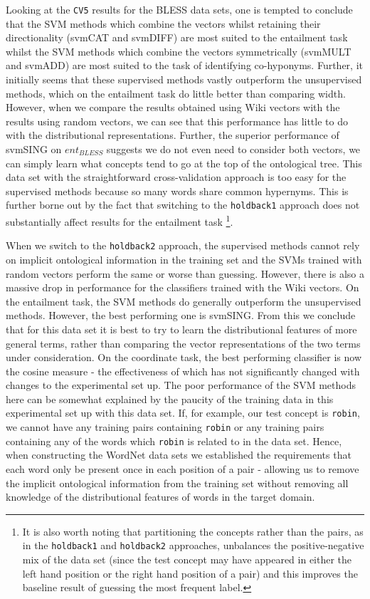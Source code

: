 \documentclass[11pt]{article}
\begin{document}
Looking at the \texttt{CV5} results for the BLESS data sets, one is tempted to conclude that the SVM methods which combine the vectors whilst retaining their directionality (svmCAT and svmDIFF) are most suited to the entailment task whilst the SVM methods which combine the vectors symmetrically (svmMULT and svmADD) are most suited to the task of identifying co-hyponyms.  Further, it initially seems that these supervised methods vastly outperform the unsupervised methods, which on the entailment task do little better than comparing width.  However, when we compare the results obtained using Wiki vectors with the results using random vectors, we can see that this performance has little to do with the distributional representations.  Further, the superior performance of svmSING on $ent_{BLESS}$ suggests we do not even need to consider both vectors, we can simply learn what concepts tend to go at the top of the ontological tree.  This data set with the straightforward cross-validation approach is too easy for the supervised methods because so many words share common hypernyms.  This is further borne out by the fact that switching to the \texttt{holdback1} approach does not substantially affect results for the entailment task \footnote{It is also worth noting that partitioning the concepts rather than the pairs, as in the \texttt{holdback1} and \texttt{holdback2} approaches,  unbalances the positive-negative mix of the data set (since the test concept may have appeared in either the left hand position or the right hand position of a pair) and this improves the baseline result of guessing the most frequent label.}.

When we switch to the \texttt{holdback2} approach, the supervised methods cannot rely on implicit ontological information in the training set and the SVMs trained with random vectors perform the same or worse than guessing.  However, there is also a massive drop in performance for the classifiers trained with the Wiki vectors.   On the entailment task, the SVM methods do generally outperform the unsupervised methods.  However, the best performing one is svmSING.  From this we conclude that for this data set it is best to try to learn the distributional features of more general terms, rather than comparing the vector representations of the two terms under consideration.   On the coordinate task, the best performing classifier is now the cosine measure - the effectiveness of which has not significantly changed with changes to the experimental set up.   The poor performance of the SVM methods here can be somewhat explained by the paucity of the training data in this experimental set up with this data set.  If, for example, our test concept is \texttt{robin}, we cannot have any training pairs containing \texttt{robin} or any training pairs containing any of the words which \texttt{robin} is related to in the data set.  Hence, when constructing the WordNet data sets we established the requirements that each word only be present once in each position of a pair - allowing us to remove the implicit ontological information from the training set without removing all knowledge of the distributional features of words in the target domain.
\end{document}
